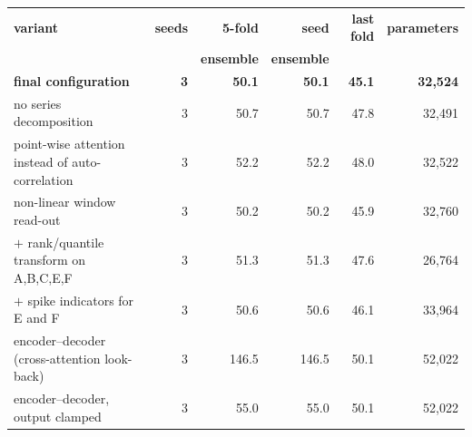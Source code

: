 \begin{tabular}{@{}p{3.1in}rrrrr@{}}
\toprule
\textbf{variant} & \textbf{seeds} & \textbf{5-fold} & \textbf{seed} & \textbf{last fold} & \textbf{parameters} \\
 & & \textbf{ensemble} & \textbf{ensemble} & & \\
\midrule
\textbf{final configuration} & \textbf{3} & \textbf{50.1} & \textbf{50.1} & \textbf{45.1} & \textbf{32{,}524} \\
no series decomposition & 3 & 50.7 & 50.7 & 47.8 & 32{,}491 \\
point-wise attention instead of auto-correlation & 3 & 52.2 & 52.2 & 48.0 & 32{,}522 \\
non-linear window read-out & 3 & 50.2 & 50.2 & 45.9 & 32{,}760 \\
$+$ rank/quantile transform on A,B,C,E,F & 3 & 51.3 & 51.3 & 47.6 & 26{,}764 \\
$+$ spike indicators for E and F & 3 & 50.6 & 50.6 & 46.1 & 33{,}964 \\
encoder--decoder (cross-attention look-back) & 3 & 146.5 & 146.5 & 50.1 & 52{,}022 \\
encoder--decoder, output clamped & 3 & 55.0 & 55.0 & 50.1 & 52{,}022 \\
\bottomrule
\end{tabular}
